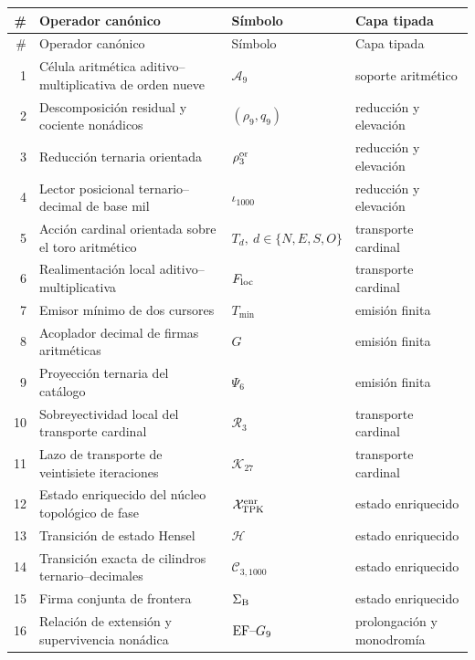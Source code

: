 \begingroup
\footnotesize
\renewcommand{\arraystretch}{1.06}

\begin{longtable}{@{}r >{\raggedright\arraybackslash}p{}
  >{\raggedright\arraybackslash}p{}
  >{\raggedright\arraybackslash}p{}@{}}
\toprule
\# & Operador canónico & Símbolo & Capa tipada \\
\midrule
\endfirsthead
\toprule
\# & Operador canónico & Símbolo & Capa tipada \\
\midrule
\endhead
1 & Célula aritmética aditivo--multiplicativa de orden nueve
  & \(\mathcal A_9\) & soporte aritmético \\
2 & Descomposición residual y cociente nonádicos
  & \((\rho_9,q_9)\) & reducción y elevación \\
3 & Reducción ternaria orientada
  & \(\rho_3^{\rm or}\) & reducción y elevación \\
4 & Lector posicional ternario--decimal de base mil
  & \(\iota_{1000}\) & reducción y elevación \\
5 & Acción cardinal orientada sobre el toro aritmético
  & \(T_d,\ d\in\{N,E,S,O\}\) & transporte cardinal \\
6 & Realimentación local aditivo--multiplicativa
  & \(F_{\rm loc}\) & transporte cardinal \\
7 & Emisor mínimo de dos cursores
  & \(T_{\min}\) & emisión finita \\
8 & Acoplador decimal de firmas aritméticas
  & \(G\) & emisión finita \\
9 & Proyección ternaria del catálogo
  & \(\Psi_6\) & emisión finita \\
10 & Sobreyectividad local del transporte cardinal
  & \(\mathcal R_3\) & transporte cardinal \\
11 & Lazo de transporte de veintisiete iteraciones
  & \(\mathcal K_{27}\) & transporte cardinal \\
12 & Estado enriquecido del núcleo topológico de fase
  & \(\mathcal X_{\rm TPK}^{\rm enr}\) & estado enriquecido \\
13 & Transición de estado Hensel
  & \(\mathcal H\) & estado enriquecido \\
14 & Transición exacta de cilindros ternario--decimales
  & \(\mathcal C_{3,1000}\) & estado enriquecido \\
15 & Firma conjunta de frontera
  & \(\Sigma_{\rm B}\) & estado enriquecido \\
16 & Relación de extensión y supervivencia nonádica
  & \({\rm EF}\text{--}G_9\) & prolongación y monodromía \\

\end{longtable}
